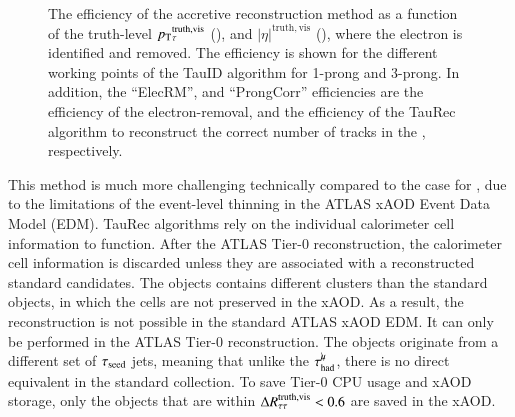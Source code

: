     \begin{figure}[htbp]
        \centering
        \\
        \caption{The efficiency of the accretive \tauhaderm reconstruction method as a function of the truth-level
        $p_{\text{T}}{}_{\tau}^\mathrm{truth,vis}$ (\protect{}), 
        and $|\eta|^\mathrm{truth, vis}$ (\protect{}), 
        where the electron is identified and removed. The
        efficiency is shown for the different working points of the TauID algorithm for 1-prong and 3-prong. In addition, the ``ElecRM'', and ``ProngCorr'' efficiencies are 
        the efficiency of the electron-removal, and 
        the efficiency of the TauRec algorithm to reconstruct the correct number of tracks in the \tauhad, respectively.}
        \label{fig:erm:eff_new_trkrm}
    \end{figure}

    This method is much more challenging technically compared to the case for \tauhadmurm, 
    due to the limitations of the event-level thinning in the ATLAS xAOD Event Data Model (EDM). 
    TauRec algorithms rely on the individual calorimeter cell information to function.
    After the ATLAS Tier-0 reconstruction, the calorimeter cell information is discarded 
    unless they are associated with a reconstructed standard \tauhad candidates.
    The \tauhaderm objects contains different clusters than the standard \tauhad objects, 
    in which the cells are not preserved in the xAOD.
    As a result, the \tauhaderm reconstruction is not possible in the standard ATLAS xAOD EDM. 
    It can only be performed in the ATLAS Tier-0 reconstruction. 
    The \tauhaderm objects originate from a different set of $\tau_\mathrm{seed}$ jets,
    meaning that unlike the $\tau_\mathrm{had}^{\mu\mkern-10mu\backslash}$, there is no direct equivalent in the standard \tauhad collection. 
    To save Tier-0 CPU usage and xAOD storage, only the \tauhaderm objects that are within 
    $\Delta R_\mathrm{\tau\tau}^\mathrm{truth, vis} < 0.6$ are saved in the xAOD.

